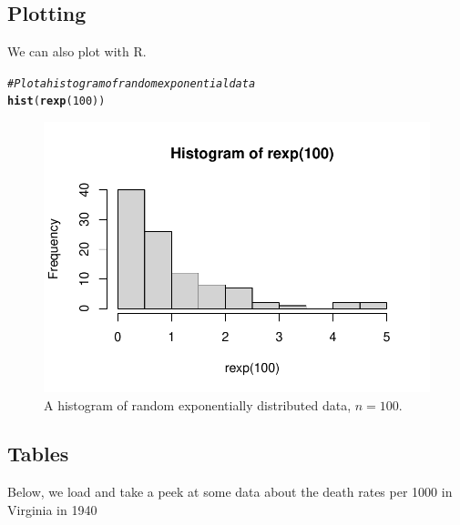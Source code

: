 \documentclass{article}\usepackage[]{graphicx}\usepackage[]{xcolor}
\makeatletter
\def\maxwidth{ %
  \ifdim\Gin@nat@width>\linewidth
    \linewidth
  \else
    \Gin@nat@width
  \fi
}
\newcommand{\hlnum}[1]{\textcolor[rgb]{0.686,0.059,0.569}{#1}}%
\newcommand{\hlcom}[1]{\textcolor[rgb]{0.678,0.584,0.686}{\textit{#1}}}%
\newcommand{\hldef}[1]{\textcolor[rgb]{0.345,0.345,0.345}{#1}}%
\newcommand{\hlkwd}[1]{\textcolor[rgb]{0.737,0.353,0.396}{\textbf{#1}}}%
\newenvironment{kframe}{%
 \def\at@end@of@kframe{}%
 \ifinner\ifhmode%
  \def\at@end@of@kframe{\end{minipage}}%
  \begin{minipage}{\columnwidth}%
 \fi\fi%
 \def\FrameCommand##1{\hskip\@totalleftmargin \hskip-\fboxsep
 \colorbox{shadecolor}{##1}\hskip-\fboxsep
     \hskip-\linewidth \hskip-\@totalleftmargin \hskip\columnwidth}%
 \MakeFramed {\advance\hsize-\width
   \@totalleftmargin\z@ \linewidth\hsize
   \@setminipage}}%
 {\par\unskip\endMakeFramed%
 \at@end@of@kframe}
\newenvironment{knitrout}{}{} %
\makeatother
\begin{document}
\begin{multicols}{2}
\subsection{Plotting}
We can also plot with R.
\begin{knitrout}\scriptsize
{}\color{fgcolor}\begin{kframe}
\begin{alltt}
\hlcom{#Plot a histogram of random exponential data}
\hlkwd{hist}\hldef{(}\hlkwd{rexp}\hldef{(}\hlnum{100}\hldef{))}
\end{alltt}
\end{kframe}
\end{knitrout}

\begin{figure}[H]
  \begin{center}
\begin{knitrout}
\color{fgcolor}
\includegraphics[width=\maxwidth]{figure/unnamed-chunk-6-1} 
\end{knitrout}
\caption{A histogram of random exponentially distributed data, $n=100$.}
\label{plot1} %
  \end{center}
\end{figure}

\columnbreak

\subsection{Tables}
Below, we load and take a peek at some data about the death rates per 1000 in Virginia in 1940 \citep{Molyneaux}


\end{multicols}
\end{document}
